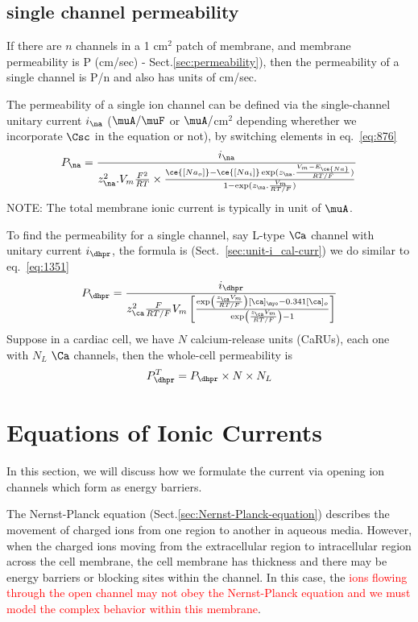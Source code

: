 \subsection{single channel permeability}
\label{sec:single-channel-permeability}

If there are $n$ channels in a 1 cm$^2$ patch of membrane, and membrane
permeability is P (cm/sec) - Sect.\ref{sec:permeability}), then the permeability
of a single channel is P/n and also has units of cm/sec.


The permeability of a single ion channel can be defined via the single-channel
unitary current $i_\na$ ($\muA/\muF$ or $\muA/$cm$^2$ depending wherether we
incorporate $\Csc$ in the equation or not), by switching elements in
eq.~\eqref{eq:876}
\begin{equation}
  \label{eq:1351}
P_\na =   \frac{i_\na}{
z_\na^2.V_m\frac{F^2}{RT}\times\frac{\ce{[Na_o]}-\ce{[Na_i]}\exp(z_\na.\frac{V_m-E_{\ce{Na}}}{RT/F})}{1-\exp(z_\na.\frac{V_m}{RT/F})}}
\end{equation}
NOTE: The total membrane ionic current is typically in unit of $\muA$.

To find the permeability for a single channel, say L-type $\Ca$ channel with
unitary current $i_\dhpr$, the formula is (Sect.~\ref{sec:unit-i_cal-curr})
we do similar to eq.~\eqref{eq:1351}
\begin{equation}
  \label{eq:1353}
  P_\dhpr = \frac{i_\dhpr}{z_\ca ^2 \frac{F}{RT/F}V_m
    \left[\frac{\exp\left(\frac{z_\ca V_m}{RT/F}\right)[\ca]_\myo-0.341[\ca]_o}{\exp\left(\frac{z_\ca V_m}{RT/F}\right)
        - 1} \right]}
\end{equation}
Suppose in a cardiac cell, we have $N$ calcium-release units (CaRUs), each one
with $N_L$ $\Ca$ channels, then the whole-cell permeability is
\begin{equation}
  \label{eq:1352}
  P_\dhpr^T = P_\dhpr \times  N \times  N_L
\end{equation}






\section{Equations of Ionic Currents}
\label{sec:equat-ionic-curr}

In this section, we will discuss how we formulate the current via opening ion
channels which form as energy barriers.

The Nernst-Planck equation (Sect.\ref{sec:Nernst-Planck-equation}) describes the
movement of charged ions from one region to another in aqueous media. However,
when the charged ions moving from the extracellular region to intracellular
region across the cell membrane, the cell membrane has thickness and there may
be energy barriers or blocking sites within the channel.
In this case, the \textcolor{red}{ions flowing through the open channel may not
obey the Nernst-Planck equation and we must model the complex behavior within this
membrane}.

